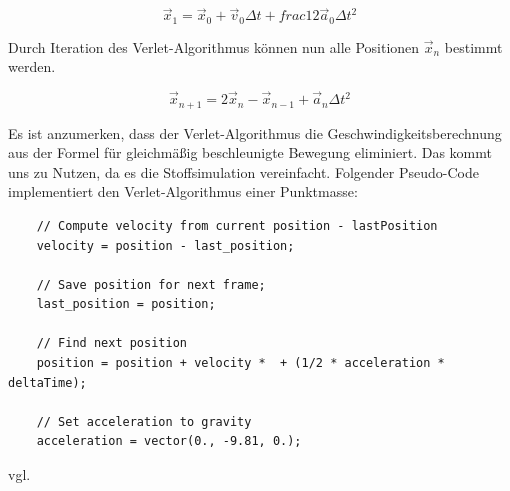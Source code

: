 \begin{equation}
	\vec{x}_{1} = \vec{x}_0 + \vec{v}_{0}\Delta t + frac{1}{2} \vec{a}_0\Delta t^2 
\end{equation}

Durch Iteration des Verlet-Algorithmus können nun alle Positionen $\vec{x}_n$ bestimmt werden.

\begin{equation}
	\vec{x}_{n+1} = 2\vec{x}_n - \vec{x}_{n-1} + \vec{a}_n\Delta t^2 
\end{equation}

Es ist anzumerken, dass der Verlet-Algorithmus die Geschwindigkeitsberechnung aus der Formel für gleichmäßig beschleunigte Bewegung eliminiert. Das kommt uns zu Nutzen, da es die Stoffsimulation vereinfacht.
\newline\newline
Folgender Pseudo-Code implementiert den Verlet-Algorithmus einer Punktmasse:
\begin{adjustwidth}{1cm}{-5cm}
\begin{verbatim}
	// Compute velocity from current position - lastPosition
	velocity = position - last_position;
	
	// Save position for next frame;
	last_position = position;
	
	// Find next position
	position = position + velocity *  + (1/2 * acceleration * deltaTime);
	
	// Set acceleration to gravity
	acceleration = vector(0., -9.81, 0.);
\end{verbatim}	
\end{adjustwidth}


vgl. \cite{Wiver2022}

